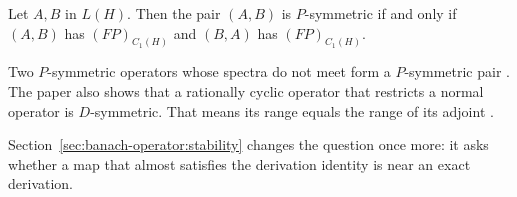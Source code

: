 \begin{theorem}\label{thm:banach:p-symmetric-pair}
Let $A,B$ in $L(H)$. Then the pair $(A,B)$ is $P$-symmetric if and only if
$(A,B)$ has $(FP)_{C_1(H)}$ and $(B,A)$ has $(FP)_{C_1(H)}$.
\end{theorem}

Two $P$-symmetric operators whose spectra do not meet form a $P$-symmetric pair
\cite[Theorem~3.7, p.~151]{BouhafsiEchChadZouaki2022}. The paper also shows that a rationally cyclic operator that restricts a
normal operator is $D$-symmetric. That means its range equals the range of
its adjoint \cite[Theorem~3.12, p.~152]{BouhafsiEchChadZouaki2022}.

Section~\ref{sec:banach-operator:stability}
changes the question once more: it asks whether a map that almost
satisfies the derivation identity is near an exact derivation.
